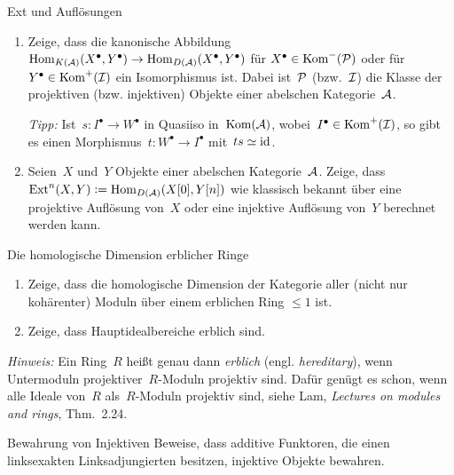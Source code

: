 \documentclass{uebblatt}
\begin{document}

\begin{aufgabe}{Ext und Auflösungen}
\begin{enumerate}
\item Zeige, dass die kanonische Abbildung~$\Hom_{K(\A)}(X^\bullet,Y^\bullet)
\to \Hom_{D(\A)}(X^\bullet,Y^\bullet)$ für $X^\bullet \in \Kom^{-}(\P)$ oder
für~$Y^\bullet \in \Kom^{+}(\I)$ ein Isomorphismus ist. Dabei ist~$\P$
(bzw.~$\I$) die Klasse der projektiven (bzw. injektiven) Objekte einer
abelschen Kategorie~$\A$.

{\tiny \emph{Tipp:} Ist~$s : I^\bullet \to W^\bullet$ in Quasiiso in~$\Kom(\A)$,
wobei~$I^\bullet \in \Kom^{+}(\I)$, so gibt es einen
Morphismus~$t : W^\bullet \to I^\bullet$ mit~$ts \simeq \id$.\par}
\item Seien~$X$ und~$Y$ Objekte einer abelschen Kategorie~$\A$. Zeige,
dass~$\Ext^n(X,Y) \defeq \Hom_{D(\A)}(X[0],Y[n])$ wie klassisch bekannt
über eine projektive Auflösung von~$X$ oder eine injektive Auflösung von~$Y$
berechnet werden kann.
\end{enumerate}
\end{aufgabe}

\begin{aufgabe}{Die homologische Dimension erblicher Ringe}
\begin{enumerate}
\item Zeige, dass die homologische Dimension der Kategorie aller (nicht nur
kohärenter) Moduln über einem erblichen Ring $\leq 1$ ist.
\item Zeige, dass Hauptidealbereiche erblich sind.
\end{enumerate}
{\tiny\emph{Hinweis:} Ein Ring~$R$ heißt genau dann \emph{erblich} (engl.
\emph{hereditary}), wenn Untermoduln projektiver~$R$-Moduln projektiv sind.
Dafür genügt es schon, wenn alle Ideale von~$R$ als~$R$-Moduln projektiv
sind, siehe Lam, \emph{Lectures on modules and rings}, Thm.~2.24.\par}
\end{aufgabe}

\begin{aufgabe}{Bewahrung von Injektiven}
Beweise, dass additive Funktoren, die einen linksexakten Linksadjungierten
besitzen, injektive Objekte bewahren.
\end{aufgabe}
\end{document}
